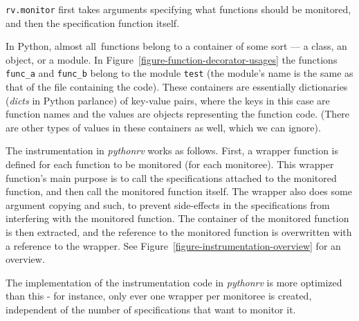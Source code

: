 \documentclass[a4paper,11pt]{kth-mag}
\begin{document}
\texttt{rv.monitor} first takes arguments specifying what functions should be
monitored, and then the specification function itself.

In Python, almost all\footnotemark\ functions belong to a container of some
sort --- a class, an object, or a module. In
Figure~\ref{figure-function-decorator-usages} the functions \texttt{func\_a}
and \texttt{func\_b} belong to the module \texttt{test} (the module's name is
the same as that of the file containing the code). These containers are
essentially dictionaries (\textit{dicts} in Python parlance) of key-value
pairs, where the keys in this case are function names and the values are
objects representing the function code. (There are other types of values in
these containers as well, which we can ignore).


The instrumentation in \textit{pythonrv} works as follows. First, a wrapper
function is defined for each function to be monitored (for each monitoree).
This wrapper function's main purpose is to call the specifications attached to
the monitored function, and then call the monitored function itself. The
wrapper also does some argument copying and such, to prevent side-effects in
the specifications from interfering with the monitored function. The container
of the monitored function is then extracted, and the reference to the monitored
function is overwritten with a reference to the wrapper. See
Figure~\ref{figure-instrumentation-overview} for an overview.

The implementation of the instrumentation code in \textit{pythonrv} is more
optimized than this - for instance, only ever one wrapper per monitoree is
created, independent of the number of specifications that want to monitor it.
\end{document}
